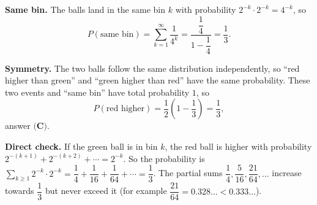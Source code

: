 \textbf{Same bin.} The balls land in the same bin $k$ with probability $2^{-k}\cdot2^{-k}=4^{-k}$, so
\[P(\text{same bin})=\sum_{k=1}^{\infty}\dfrac{1}{4^k}=\dfrac{\dfrac14}{1-\dfrac14}=\dfrac13.\]

\textbf{Symmetry.} The two balls follow the same distribution independently, so ``red higher than green'' and ``green higher than red'' have the same probability. These two events and ``same bin'' have total probability $1$, so
\[P(\text{red higher})=\dfrac12\left(1-\dfrac13\right)=\boxed{\dfrac13},\]
answer $\textbf{(C)}$.

\textbf{Direct check.} If the green ball is in bin $k$, the red ball is higher with probability $2^{-(k+1)}+2^{-(k+2)}+\cdots=2^{-k}$. So the probability is $\displaystyle\sum_{k\ge1}2^{-k}\cdot2^{-k}=\dfrac14+\dfrac1{16}+\dfrac1{64}+\cdots=\dfrac13$. The partial sums $\dfrac14,\dfrac{5}{16},\dfrac{21}{64},\dots$ increase towards $\dfrac13$ but never exceed it (for example $\dfrac{21}{64}=0.328\ldots<0.333\ldots$).
